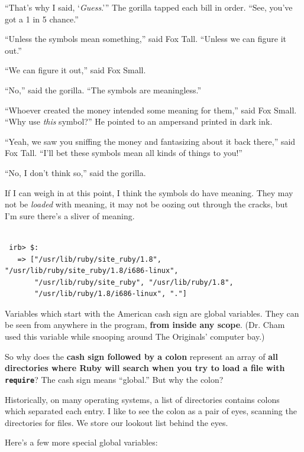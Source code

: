 \documentclass[10pt,twoside]{report}
\begin{document}
``That's why I said, `{\em Guess}.'''  The gorilla tapped each bill in
order.  ``See, you've got a 1 in 5 chance.''

``Unless the symbols mean something,'' said Fox Tall.  ``Unless we can
figure it out.''

``We can figure it out,'' said Fox Small.

``No,'' said the gorilla.  ``The symbols are meaningless.''

``Whoever created the money intended some meaning for them,'' said Fox
Small.  ``Why use {\em this} symbol?''  He pointed to an ampersand
printed in dark ink.

``Yeah, we saw you sniffing the money and fantasizing about it back
there,'' said Fox Tall.  ``I'll bet these symbols mean all kinds of
things to you!''

``No, I don't think so,'' said the gorilla.

If I can weigh in at this point, I think the symbols do have meaning.
They may not be {\em loaded} with meaning, it may not be oozing out
through the cracks, but I'm sure there's a sliver of meaning.


\begin{lstlisting}

 irb> $:
   => ["/usr/lib/ruby/site_ruby/1.8", "/usr/lib/ruby/site_ruby/1.8/i686-linux",
       "/usr/lib/ruby/site_ruby", "/usr/lib/ruby/1.8",
       "/usr/lib/ruby/1.8/i686-linux", "."]

\end{lstlisting}


Variables which start with the American cash sign are global
variables.  They can be seen from anywhere in the program, {\bf from
  inside any scope}.  (Dr. Cham used this variable while snooping
around The Originals' computer bay.)

So why does the {\bf cash sign followed by a colon} represent an array
of {\bf all directories where Ruby will search when you try to load a
  file with \lstinline[breaklines=true]|require|}?  The cash sign
means ``global.''  But why the colon?

Historically, on many operating systems, a list of directories
contains colons which separated each entry.  I like to see the colon
as a pair of eyes, scanning the directories for files.  We store our
lookout list behind the eyes.

Here's a few more special global variables:
\end{document}
